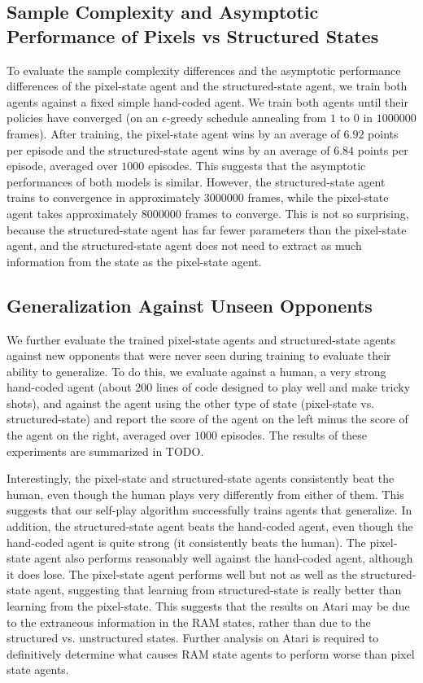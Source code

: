 \documentclass[10pt,twocolumn,letterpaper]{article}
\begin{document}
\subsection{Sample Complexity and Asymptotic Performance of Pixels vs
Structured States}
To evaluate the sample complexity differences and the asymptotic performance
differences of the pixel-state agent and the structured-state agent, we train
both agents against a fixed simple hand-coded agent. We train both agents
until their policies have converged (on an $\epsilon$-greedy schedule
annealing from $1$ to $0$ in $1000000$ frames). After training, the
pixel-state agent wins by an average of $6.92$ points per episode and the
structured-state agent wins by an average of $6.84$ points per episode,
averaged over $1000$ episodes. This suggests that the asymptotic performances
of both models is similar. However, the structured-state agent trains to
convergence in approximately $3000000$ frames, while the pixel-state agent
takes approximately $8000000$ frames to converge. This is not so surprising,
because the structured-state agent has far fewer parameters than the
pixel-state agent, and the structured-state agent does not need to extract as
much information from the state as the pixel-state agent.

\subsection{Generalization Against Unseen Opponents}
We further evaluate the trained pixel-state agents and structured-state agents
against new opponents that were never seen during training to evaluate their
ability to generalize. To do this, we evaluate against a human, a very strong
hand-coded agent (about 200 lines of code designed to play well and make
tricky shots), and against the agent using the other type of state
(pixel-state vs. structured-state) and report the score of the agent on the
left minus the score of the agent on the right, averaged over $1000$ episodes.
The results of these experiments are summarized in TODO.

Interestingly, the pixel-state and structured-state agents consistently beat the
human, even though the human plays very differently from either of them. This
suggests that our self-play algorithm successfully trains agents that
generalize. In addition, the structured-state agent beats the hand-coded
agent, even though the hand-coded agent is quite strong (it consistently beats
the human). The pixel-state agent also performs reasonably well against the
hand-coded agent, although it does lose. The pixel-state agent performs well
but not as well as the structured-state agent, suggesting that learning from
structured-state is really better than learning from the pixel-state. This
suggests that the results on Atari may be due to the extraneous information in
the RAM states, rather than due to the structured vs. unstructured states.
Further analysis on Atari is required to definitively determine what causes
RAM state agents to perform worse than pixel state agents.
\end{document}
